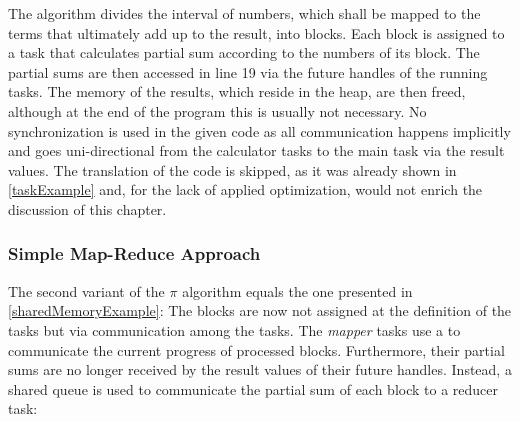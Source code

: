 The algorithm divides the interval of numbers, which shall be mapped to the terms that ultimately add up to the result, into blocks. Each block is assigned to a task that calculates partial sum according to the numbers of its block. The partial sums are then accessed in line 19 via the future handles of the running tasks. The memory of the results, which reside in the heap, are then freed, although at the end of the program this is usually not necessary. No synchronization is used in the given code as all communication happens implicitly and goes uni-directional from the calculator tasks to the main task via the result values. The translation of the code is skipped, as it was already shown in \ref{taskExample} and, for the lack of applied optimization, would not enrich the discussion of this chapter. 

\subsubsection{Simple Map-Reduce Approach}
The second variant of the $\pi$ algorithm equals the one presented in \ref{sharedMemoryExample}: The blocks are now not assigned at the definition of the tasks but via communication among the tasks. The \textit{mapper} tasks use a  to communicate the current progress of processed blocks. Furthermore, their partial sums are no longer received by the result values of their future handles. Instead, a shared queue is used to communicate the partial sum of each block to a reducer task:

